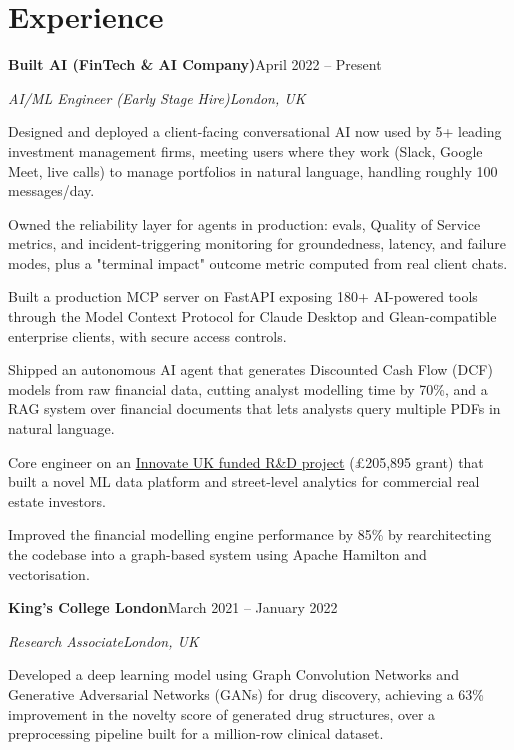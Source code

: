 \documentclass[10pt,a4paper]{article}
\newcommand{\entry}[4]{%
  {\color{company}\bfseries #1}\hfill {\color{muted}#2}\par
  \vspace{1pt}
  {\itshape #3}\hfill {\color{muted}\itshape #4}\par
  \vspace{3pt}%
}
\begin{document}
\section{Experience}
\entry{Built AI (FinTech \& AI Company)}{April 2022 -- Present}{AI/ML Engineer (Early Stage Hire)}{London, UK}
\begin{tight}
  \item Designed and deployed a client-facing conversational AI now used by 5+ leading investment management firms, meeting users where they work (Slack, Google Meet, live calls) to manage portfolios in natural language, handling roughly 100 messages/day.
  \item Owned the reliability layer for agents in production: evals, Quality of Service metrics, and incident-triggering monitoring for groundedness, latency, and failure modes, plus a "terminal impact" outcome metric computed from real client chats.
  \item Built a production MCP server on FastAPI exposing 180+ AI-powered tools through the Model Context Protocol for Claude Desktop and Glean-compatible enterprise clients, with secure access controls.
  \item Shipped an autonomous AI agent that generates Discounted Cash Flow (DCF) models from raw financial data, cutting analyst modelling time by 70\%, and a RAG system over financial documents that lets analysts query multiple PDFs in natural language.
  \item Core engineer on an \href{https://gtr.ukri.org/projects?ref=10022996}{Innovate UK funded R\&D project} (\pounds205,895 grant) that built a novel ML data platform and street-level analytics for commercial real estate investors.
  \item Improved the financial modelling engine performance by 85\% by rearchitecting the codebase into a graph-based system using Apache Hamilton and vectorisation.
\end{tight}

\entry{King's College London}{March 2021 -- January 2022}{Research Associate}{London, UK}
\begin{tight}
  \item Developed a deep learning model using Graph Convolution Networks and Generative Adversarial Networks (GANs) for drug discovery, achieving a 63\% improvement in the novelty score of generated drug structures, over a preprocessing pipeline built for a million-row clinical dataset.
\end{tight}
\end{document}
